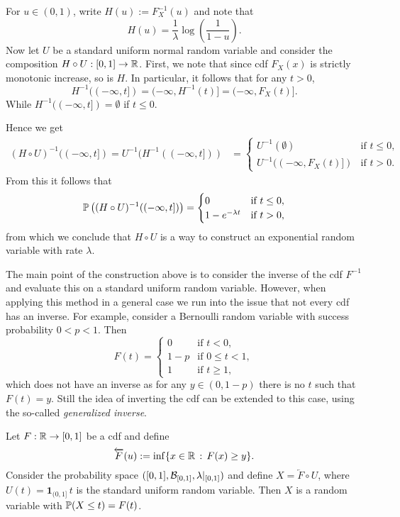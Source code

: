 For $u \in (0,1)$, write $H(u) := F_X^{-1}(u)$ and note that
\[
	H(u) = \frac{1}{\lambda} \log\left(\frac{1}{1-u}\right).
\]
Now let $U$ be a standard uniform normal random variable and consider the composition $H \circ U : [0,1] \to \mathbb R$. First, we note that since cdf $F_X(x)$ is strictly monotonic increase, so is $H$. In particular, it follows that for any $t > 0$,
\[
	H^{-1}((-\infty,t]) = (-\infty, H^{-1}(t)] = (-\infty, F_X(t)].
\]
While $H^{-1}((-\infty,t]) = \emptyset$ if $t \le 0$.

Hence we get
\begin{align*}
	(H \circ U)^{-1}((-\infty, t]) = U^{-1}(H^{-1}((-\infty, t]))
	&= \begin{cases}
		U^{-1}(\emptyset) &\text{if } t \le 0,\\
		U^{-1}((-\infty, F_X(t)]) &\text{if } t > 0.
	\end{cases}
\end{align*}
From this it follows that 
\[
	\mathbb P\left((H \circ U)^{-1}((-\infty, t])\right) = \begin{cases}
			0 &\text{if } t \le 0,\\
			1-e^{-\lambda t} &\text{if } t > 0,
		\end{cases}
\]
from which we conclude that $H \circ U$ is a way to construct an exponential random variable with rate $\lambda$.

The main point of the construction above is to consider the inverse of the cdf $F^{-1}$ and evaluate this on a standard uniform random variable. However, when applying this method in a general case we run into the issue that not every cdf has an inverse. For example, consider a Bernoulli random variable with success probability $0 < p < 1$. Then
\[
	F(t) = \begin{cases}
		0 &\text{if } t < 0, \\
		1-p &\text{if } 0 \le t < 1, \\
		1 &\text{if } t \ge 1,
	\end{cases}
\] 
which does not have an inverse as for any $y \in (0,1-p)$ there is no $t$ such that $F(t) = y$. Still the idea of inverting the cdf can be extended to this case, using the so-called \emph{generalized inverse}. 

\begin{proposition}\label{prop:construction_random_variable_inverse}
Let $F : \mathbb R \to [0,1]$ be a cdf and define
\[
	\overleftarrow{F}(u) := \inf\{ x \in \mathbb R \, : \, F(x) \ge y\}.
\]  
Consider the probability space $([0,1], \mathcal B_{[0,1]}, \lambda|_{[0,1]})$ and define $X = \overleftarrow{F}\circ U$, where $U(t) = \mathbf{1}_{(0,1]} \, t$ is the standard uniform random variable. Then $X$ is a random variable with $\mathbb P(X \le t) = F(t)$.
\end{proposition}

